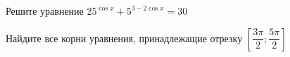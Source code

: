 \begin{ex}
	\begin{condition}
		\begin{enumcols}[label=\asbuk*)]
			\item Решите уравнение \( 25^{\cos x} + 5^{3 - 2\cos x} = 30 \)
			\item Найдите все корни уравнения, принадлежащие отрезку \( \left[\dfrac{3\pi}{2};\dfrac{5\pi}{2}\right] \)
		\end{enumcols}
	\end{condition}
\end{ex}